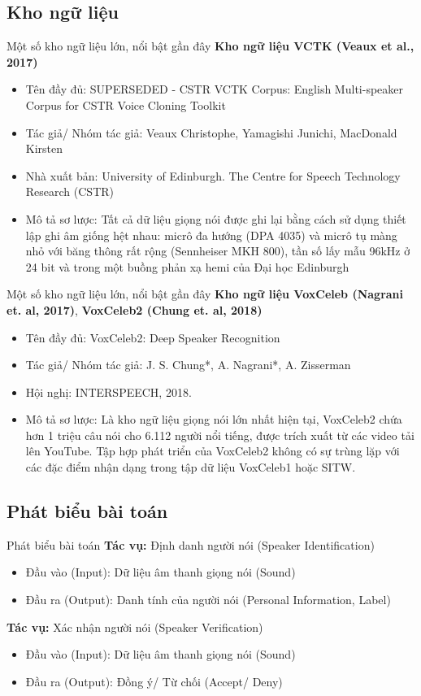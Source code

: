 \documentclass[notheorems, aspectratio=54]{beamer}
\begin{document}
\subsection{Kho ngữ liệu}
\begin{frame}{Một số kho ngữ liệu lớn, nổi bật gần đây}
	\textbf{Kho ngữ liệu VCTK (Veaux et al., 2017)}
	\begin{itemize}
		\item Tên đầy đủ: SUPERSEDED - CSTR VCTK Corpus: English Multi-speaker Corpus for CSTR Voice Cloning Toolkit
		\item Tác giả/ Nhóm tác giả: Veaux Christophe, Yamagishi Junichi, MacDonald Kirsten
		\item Nhà xuất bản: University of Edinburgh. The Centre for Speech Technology Research (CSTR)
		\item Mô tả sơ lược: Tất cả dữ liệu giọng nói được ghi lại bằng cách sử dụng thiết lập ghi âm giống hệt nhau: micrô đa hướng (DPA 4035) và micrô tụ màng nhỏ với băng thông rất rộng (Sennheiser MKH 800), tần số lấy mẫu 96kHz ở 24 bit và trong một buồng phản xạ hemi của Đại học Edinburgh
	\end{itemize}
\end{frame}
\begin{frame}{Một số kho ngữ liệu lớn, nổi bật gần đây}
	\textbf{Kho ngữ liệu VoxCeleb (Nagrani et. al, 2017)}, \textbf{VoxCeleb2 (Chung et. al, 2018)}
	\begin{itemize}
		\item Tên đầy đủ: VoxCeleb2: Deep Speaker Recognition  
		\item Tác giả/ Nhóm tác giả: J. S. Chung*, A. Nagrani*, A. Zisserman
		\item Hội nghị: INTERSPEECH, 2018.  
		\item Mô tả sơ lược: Là kho ngữ liệu giọng nói lớn nhất hiện tại, VoxCeleb2 chứa hơn 1 triệu câu nói cho 6.112 người nổi tiếng, được trích xuất từ các video tải lên YouTube. Tập hợp phát triển của VoxCeleb2 không có sự trùng lặp với các đặc điểm nhận dạng trong tập dữ liệu VoxCeleb1 hoặc SITW.
	\end{itemize}
\end{frame}
\subsection{Phát biểu bài toán}
\begin{frame}{Phát biểu bài toán}
	\textbf{Tác vụ:} Định danh người nói (Speaker Identification)
	\begin{itemize}
		\item Đầu vào (Input): Dữ liệu âm thanh giọng nói (Sound)
		\item Đầu ra (Output): Danh tính của người nói (Personal Information, Label)
	\end{itemize}
	\textbf{Tác vụ:} Xác nhận người nói (Speaker Verification)
	\begin{itemize}
		\item Đầu vào (Input): Dữ liệu âm thanh giọng nói (Sound)
		\item Đầu ra (Output): Đồng ý/ Từ chối (Accept/ Deny)
	\end{itemize}
\end{frame}
\end{document}
